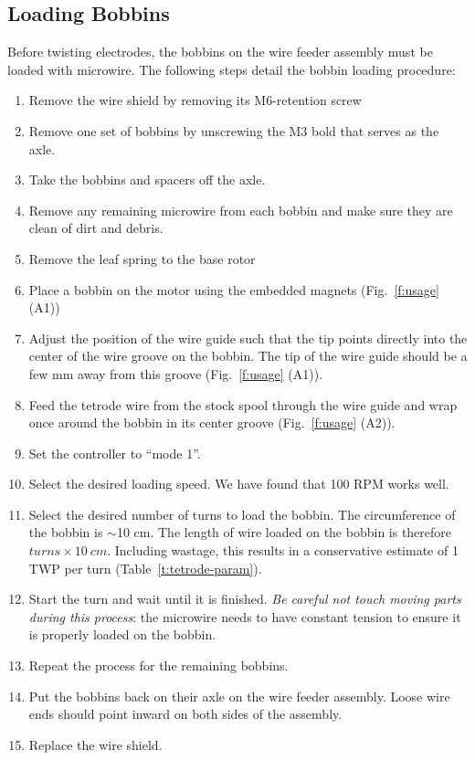 \documentclass[11pt,a4paper]{article}
\begin{document}
\subsection{Loading Bobbins}
Before twisting electrodes, the bobbins on the wire feeder assembly must be
loaded with microwire. The following steps detail the bobbin loading procedure:
\begin{enumerate}[noitemsep]
    \item Remove the wire shield by removing its M6-retention screw
    \item Remove one set of bobbins by unscrewing the M3 bold that serves as
        the axle.
    \item Take the bobbins and spacers off the axle.
    \item Remove any remaining microwire from each bobbin and make sure they
        are clean of dirt and debris.
    \item Remove the leaf spring to the base rotor
    \item Place a bobbin on the motor using the embedded magnets
        (Fig.~\ref{f:usage} (A1))
    \item Adjust the position of the wire guide such that the tip points
        directly into the center of the wire groove on the bobbin. The tip of
        the wire guide should be a few mm away from this groove
        (Fig.~\ref{f:usage} (A1)).
    \item Feed the tetrode wire from the stock spool through the wire guide and
        wrap once around the bobbin in its center groove
        (Fig.~\ref{f:usage} (A2)).
    \item Set the controller to ``mode 1''.
    \item Select the desired loading speed. We have found that 100 RPM works
        well.
    \item Select the desired number of turns to load the bobbin. The
        circumference of the bobbin is $\sim$10 cm. The length of wire loaded
        on the bobbin is therefore $turns \times 10\ cm$. Including wastage,
        this results in a conservative estimate of 1 TWP per turn
        (Table~\ref{t:tetrode-param}).
    \item Start the turn and wait until it is finished. \textit{Be careful not
        touch moving parts during this process}: the microwire needs to have
        constant tension to ensure it is properly loaded on the bobbin.
    \item Repeat the process for the remaining bobbins.
    \item Put the bobbins back on their axle on the wire feeder assembly. Loose
        wire ends should point inward on both sides of the assembly.
    \item Replace the wire shield.
\end{enumerate}
\end{document}
